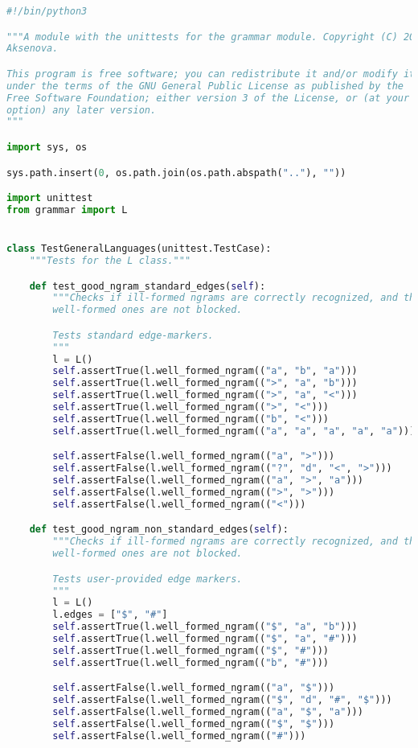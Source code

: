 \begin{lstlisting}[language=Python]
#!/bin/python3

"""A module with the unittests for the grammar module. Copyright (C) 2019 Alena
Aksenova.

This program is free software; you can redistribute it and/or modify it
under the terms of the GNU General Public License as published by the
Free Software Foundation; either version 3 of the License, or (at your
option) any later version.
"""

import sys, os

sys.path.insert(0, os.path.join(os.path.abspath(".."), ""))

import unittest
from grammar import L


class TestGeneralLanguages(unittest.TestCase):
    """Tests for the L class."""

    def test_good_ngram_standard_edges(self):
        """Checks if ill-formed ngrams are correctly recognized, and that the
        well-formed ones are not blocked.

        Tests standard edge-markers.
        """
        l = L()
        self.assertTrue(l.well_formed_ngram(("a", "b", "a")))
        self.assertTrue(l.well_formed_ngram((">", "a", "b")))
        self.assertTrue(l.well_formed_ngram((">", "a", "<")))
        self.assertTrue(l.well_formed_ngram((">", "<")))
        self.assertTrue(l.well_formed_ngram(("b", "<")))
        self.assertTrue(l.well_formed_ngram(("a", "a", "a", "a", "a")))

        self.assertFalse(l.well_formed_ngram(("a", ">")))
        self.assertFalse(l.well_formed_ngram(("?", "d", "<", ">")))
        self.assertFalse(l.well_formed_ngram(("a", ">", "a")))
        self.assertFalse(l.well_formed_ngram((">", ">")))
        self.assertFalse(l.well_formed_ngram(("<")))

    def test_good_ngram_non_standard_edges(self):
        """Checks if ill-formed ngrams are correctly recognized, and that the
        well-formed ones are not blocked.

        Tests user-provided edge markers.
        """
        l = L()
        l.edges = ["$", "#"]
        self.assertTrue(l.well_formed_ngram(("$", "a", "b")))
        self.assertTrue(l.well_formed_ngram(("$", "a", "#")))
        self.assertTrue(l.well_formed_ngram(("$", "#")))
        self.assertTrue(l.well_formed_ngram(("b", "#")))

        self.assertFalse(l.well_formed_ngram(("a", "$")))
        self.assertFalse(l.well_formed_ngram(("$", "d", "#", "$")))
        self.assertFalse(l.well_formed_ngram(("a", "$", "a")))
        self.assertFalse(l.well_formed_ngram(("$", "$")))
        self.assertFalse(l.well_formed_ngram(("#")))


\end{lstlisting}
